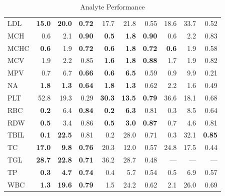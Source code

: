 \begin{table}[ht]
\begin{tabular}{lrrrrrrrrr}
LDL & \textbf{15.0} & \textbf{20.0} & \textbf{0.72} & 17.7 & 21.8 & 0.55 & 18.6 & 33.7 & 0.52 \\
MCH & 0.6 & 2.1 & \textbf{0.90} & \textbf{0.5} & \textbf{1.8} & \textbf{0.90} & 0.6 & 2.2 & 0.83 \\
MCHC & \textbf{0.6} & 1.9 & \textbf{0.72} & \textbf{0.6} & \textbf{1.8} & \textbf{0.72} & \textbf{0.6} & 1.9 & 0.58 \\
MCV & 1.9 & 2.2 & 0.85 & \textbf{1.6} & \textbf{1.8} & \textbf{0.88} & 1.7 & 1.9 & 0.82 \\
MPV & 0.7 & 6.7 & \textbf{0.66} & \textbf{0.6} & \textbf{6.5} & 0.59 & 0.9 & 9.9 & 0.21 \\
NA & \textbf{1.8} & \textbf{1.3} & \textbf{0.64} & \textbf{1.8} & \textbf{1.3} & 0.62 & 2.2 & 1.6 & 0.49 \\
PLT & 52.8 & 19.3 & 0.29 & \textbf{30.3} & \textbf{13.5} & \textbf{0.79} & 36.6 & 18.1 & 0.68 \\
RBC & \textbf{0.2} & 6.4 & \textbf{0.84} & \textbf{0.2} & \textbf{6.3} & 0.81 & 0.3 & 8.5 & 0.64 \\
RDW & \textbf{0.5} & 3.4 & 0.86 & \textbf{0.5} & \textbf{3.0} & \textbf{0.87} & 0.7 & 4.6 & 0.81 \\
TBIL & \textbf{0.1} & \textbf{22.5} & 0.81 & 0.2 & 28.0 & 0.71 & 0.3 & 32.1 & \textbf{0.85} \\
TC & \textbf{17.0} & \textbf{9.8} & \textbf{0.76} & 20.3 & 12.0 & 0.57 & 24.8 & 17.5 & 0.44 \\
TGL & \textbf{28.7} & \textbf{22.8} & \textbf{0.71} & 36.2 & 28.7 & 0.48 & — & — & — \\
TP & \textbf{0.3} & \textbf{4.7} & \textbf{0.74} & 0.4 & 5.7 & 0.54 & 0.5 & 6.9 & 0.57 \\
WBC & \textbf{1.3} & \textbf{19.6} & \textbf{0.79} & 1.5 & 24.2 & 0.62 & 2.1 & 26.0 & 0.69 \\
\bottomrule
\end{tabular}
\caption{Analyte Performance}
\label{tab:analyte_performance}
\end{table}